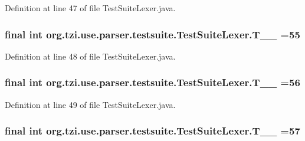 Definition at line 47 of file Test\-Suite\-Lexer.\-java.

\hypertarget{classorg_1_1tzi_1_1use_1_1parser_1_1testsuite_1_1_test_suite_lexer_ad84210b8c45a21d0785ff803794d802e}{
\subsubsection[{T\-\_\-\-\_\-55}]{\setlength{\rightskip}{0pt plus 5cm}final int org.\-tzi.\-use.\-parser.\-testsuite.\-Test\-Suite\-Lexer.\-T\-\_\-\-\_ =55\hspace{0.3cm}{\ttfamily [static]}}}\label{classorg_1_1tzi_1_1use_1_1parser_1_1testsuite_1_1_test_suite_lexer_ad84210b8c45a21d0785ff803794d802e}


Definition at line 48 of file Test\-Suite\-Lexer.\-java.

\hypertarget{classorg_1_1tzi_1_1use_1_1parser_1_1testsuite_1_1_test_suite_lexer_a558cd2030f29e3dad86e0e44de22e717}{
\subsubsection[{T\-\_\-\-\_\-56}]{\setlength{\rightskip}{0pt plus 5cm}final int org.\-tzi.\-use.\-parser.\-testsuite.\-Test\-Suite\-Lexer.\-T\-\_\-\-\_ =56\hspace{0.3cm}{\ttfamily [static]}}}\label{classorg_1_1tzi_1_1use_1_1parser_1_1testsuite_1_1_test_suite_lexer_a558cd2030f29e3dad86e0e44de22e717}


Definition at line 49 of file Test\-Suite\-Lexer.\-java.

\hypertarget{classorg_1_1tzi_1_1use_1_1parser_1_1testsuite_1_1_test_suite_lexer_a9ae803f3c3cf20aa15590bbe3b9d17c1}{
\subsubsection[{T\-\_\-\-\_\-57}]{\setlength{\rightskip}{0pt plus 5cm}final int org.\-tzi.\-use.\-parser.\-testsuite.\-Test\-Suite\-Lexer.\-T\-\_\-\-\_ =57\hspace{0.3cm}{\ttfamily [static]}}}\label{classorg_1_1tzi_1_1use_1_1parser_1_1testsuite_1_1_test_suite_lexer_a9ae803f3c3cf20aa15590bbe3b9d17c1}



